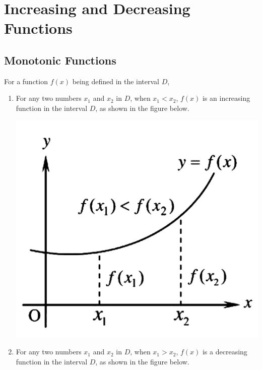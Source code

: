 


\newpage

\section{Increasing and Decreasing Functions}

\subsection*{Monotonic Functions}

For a function $f(x)$ being defined in the interval $D$,
\begin{enumerate}
    \item For any two numbers $x_1$ and $x_2$ in $D$, when $x_1 < x_2$, $f(x)$ is an
          increasing function in the interval $D$, as shown in the figure below.
          \begin{center}
              \includegraphics[scale=0.25]{assets/26-2.png}
          \end{center}
    \item For any two numbers $x_1$ and $x_2$ in $D$, when $x_1 > x_2$, $f(x)$ is a
          decreasing function in the interval $D$, as shown in the figure below.
          \begin{center}

\end{center}
\end{enumerate}

